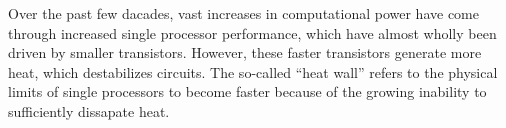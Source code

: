 




    Over the past few dacades, vast increases in computational power have come through increased single processor performance, which have almost wholly been driven by smaller transistors. However, these faster transistors generate more heat, which destabilizes circuits. The so-called ``heat wall'' refers to the physical limits of single processors to become faster because of the growing inability to sufficiently dissapate heat.

